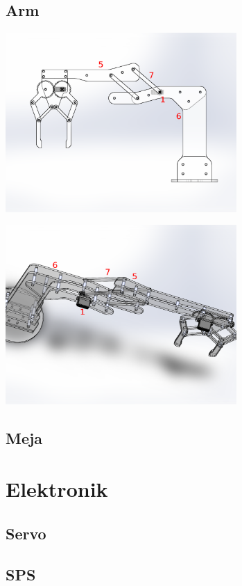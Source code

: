 \documentclass[11pt,fleqn]{book} %
\begin{document}
\section{Arm}
\begin{center}
 \includegraphics[width=250pt]{./screenshot/arm/GAF}\\
\end{center}
\begin{center}
 \includegraphics[width=250pt]{./screenshot/arm/GAF1}\\
\end{center}
\section{Meja}

\newpage
{} %
\chapter{Elektronik}
\section{Servo}

\section{SPS}
\end{document}
